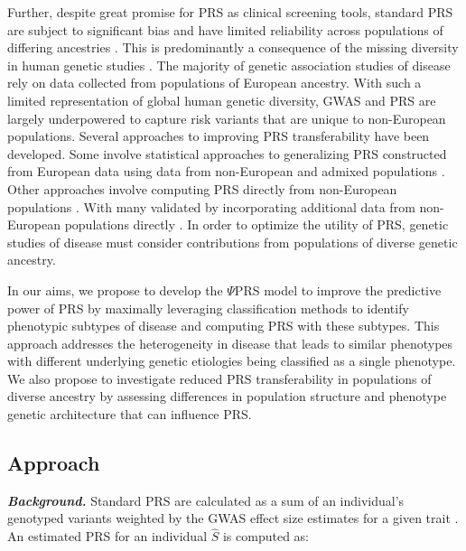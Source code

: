 \documentclass[11pt]{article}  %
\begin{document}
\hspace{10mm}Further, despite great promise for PRS as clinical screening tools, standard PRS are subject to significant bias and have limited reliability across populations of differing ancestries \cite{majara_low_2021}. This is predominantly a consequence of the missing diversity in human genetic studies \cite{sirugo_missing_2019}. The majority of genetic association studies of disease rely on data collected from populations of European ancestry. With such a limited representation of global human genetic diversity, GWAS and PRS are largely underpowered to capture risk variants that are unique to non-European populations. Several approaches to improving PRS transferability have been developed. Some involve statistical approaches to generalizing PRS constructed from European data using data from non-European and admixed populations \cite{grinde_generalizing_2019}. Other approaches involve computing PRS directly from non-European populations \cite{martin_critical_2018}. With many validated by incorporating additional data from non-European populations directly \cite{cavazos_inclusion_2021}. In order to optimize the utility of PRS, genetic studies of disease must consider contributions from populations of diverse genetic ancestry. 

\hspace{10mm}In our aims, we propose to develop the $\Psi$PRS model to improve the predictive power of PRS by maximally leveraging classification methods to identify phenotypic subtypes of disease and computing PRS with these subtypes. This approach addresses the heterogeneity in disease that leads to similar phenotypes with different underlying genetic etiologies being classified as a single phenotype. We also propose to investigate reduced PRS transferability in populations of diverse ancestry by assessing differences in population structure and phenotype genetic architecture that can influence PRS. 





\subsection*{Approach}

\textbf{\textit{Background.}} Standard PRS are calculated as a sum of an individual's genotyped variants weighted by the GWAS effect size estimates for a given trait \cite{choi_tutorial_2020}. An estimated PRS for an individual $\hat{S}$ is computed as:
\end{document}
